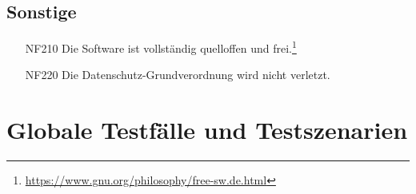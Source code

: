 \documentclass[parskip=full]{scrartcl}
\begin{document}
\subsection{Sonstige}

\begin{itemize}

\item[NF210] Die Software ist vollständig quelloffen und frei.\footnote{\url{https://www.gnu.org/philosophy/free-sw.de.html}}
\item[NF220] Die Datenschutz-Grundverordnung wird nicht verletzt.

\end{itemize}

\section{Globale Testfälle und Testszenarien}
\end{document}
